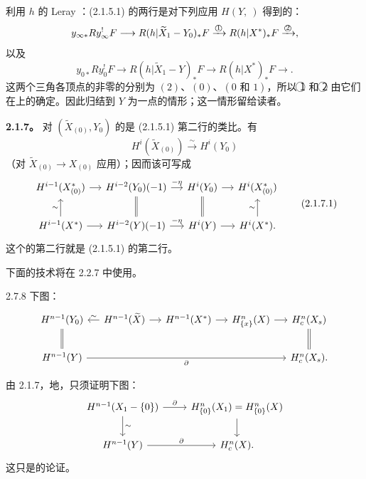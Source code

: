利用 $h$ 的 Leray ：(2.1.5.1) 的两行是对下列应用 $H(Y,\ )$ 得到的：
\[
 y_{\infty*}Ry_\infty^!F\longrightarrow R(h|\widetilde X_1-Y_0)_*F
 \xrightarrow{\text{\textcircled{1}}}R(h|X^*)_*F\xrightarrow{\text{\textcircled{2}}},
\]
以及
\[
 y_{0*}Ry_0^!F\longrightarrow R(h|\widetilde X_1-Y)_*F
 \longrightarrow R(h|X^*)_*F\longrightarrow.
\]
这两个三角各顶点的非零的分别为 $(2)$、$(0)$、$(0\text{ 和 }1)$，所以 \textcircled{1} 和 \textcircled{2} 由它们在上的确定。因此归结到 $Y$ 为一点的情形；这一情形留给读者。

\textbf{2.1.7。} 对 $(\widetilde X_{(0)},Y_0)$ 的是 (2.1.5.1) 第二行的类比。有
\[
 H^i(\widetilde X_{(0)})\xrightarrow{\sim}H^i(Y_0)
\]
（对 $\widetilde X_{(0)}\to X_{(0)}$ 应用）；因而该可写成
\[
\begin{tikzcd}[column sep=small]
H^{i-1}(X^*_{(0)})\arrow[r]&H^{i-2}(Y_0)(-1)\arrow[r,"-\eta"]\arrow[d,equal]&H^i(Y_0)\arrow[r]\arrow[d,equal]&H^i(X^*_{(0)})\\
H^{i-1}(X^*)\arrow[r]\arrow[u,"\sim"]&H^{i-2}(Y)(-1)\arrow[r,"-\eta"]&H^i(Y)\arrow[r]&H^i(X^*)\arrow[u,"\sim"] .
\end{tikzcd}\tag{2.1.7.1}
\]
这个的第二行就是 (2.1.5.1) 的第二行。

下面的技术将在 2.2.7 中使用。
\begin{SGAresult}{}{2.7.8}
下图：
\[
\begin{tikzcd}[column sep=small]
H^{n-1}(Y_0)\arrow[r,"\sim",leftarrow]\arrow[d,equal]&H^{n-1}(\widetilde X)\arrow[r]&H^{n-1}(X^*)\arrow[r]&H^n_{\{x\}}(X)\arrow[r]&H_c^n(X_s)\arrow[d,equal]\\
H^{n-1}(Y)\arrow[rrrr,"\partial"']&&&&H_c^n(X_s).
\end{tikzcd}
\]
\end{SGAresult}
由 2.1.7，地，只须证明下图：
\[
\begin{tikzcd}
H^{n-1}(X_1-\{0\})\arrow[r,"\partial"]\arrow[d,"\sim"]&H^n_{\{0\}}(X_1)=H^n_{\{0\}}(X)\arrow[d]\\
H^{n-1}(Y)\arrow[r,"\partial"]&H_c^n(X).
\end{tikzcd}
\]
这只是的论证。


